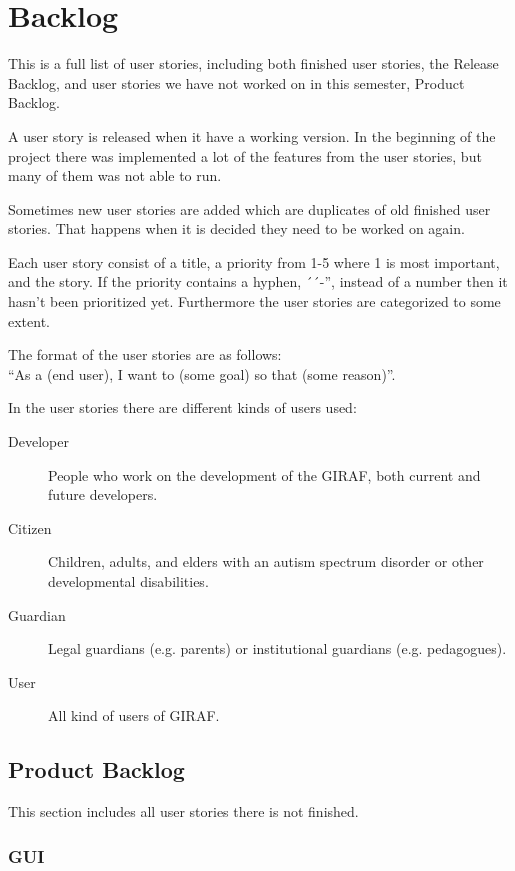 



\chapter{Backlog}
This is a full list of user stories, including both finished user stories, the Release Backlog, and user stories we have not worked on in this semester, Product Backlog.

A user story is released when it have a working version. In the beginning of the project there was implemented a lot of the features from the user stories, but many of them was not able to run.

Sometimes new user stories are added which are duplicates of old finished user stories. That happens when it is decided they need to be worked on again.

Each user story consist of a title, a priority from 1-5 where 1 is most important, and the story. If the priority contains a hyphen, ´´-'', instead of a number then it hasn't been prioritized yet.
Furthermore the user stories are categorized to some extent.

The format of the user stories are as follows: \\
``As a (end user), I want to (some goal) so that (some reason)''.

In the user stories there are different kinds of users used:
\begin{description}
	\item [Developer] People who work on the development of the GIRAF, both current and future developers.
	\item [Citizen] Children, adults, and elders with an autism spectrum disorder or other developmental disabilities.
	\item [Guardian] Legal guardians (e.g. parents) or institutional guardians (e.g. pedagogues).
	\item [User] All kind of users of GIRAF.
\end{description}

\section{Product Backlog}
This section includes all user stories there is not finished.

\subsection{GUI}

